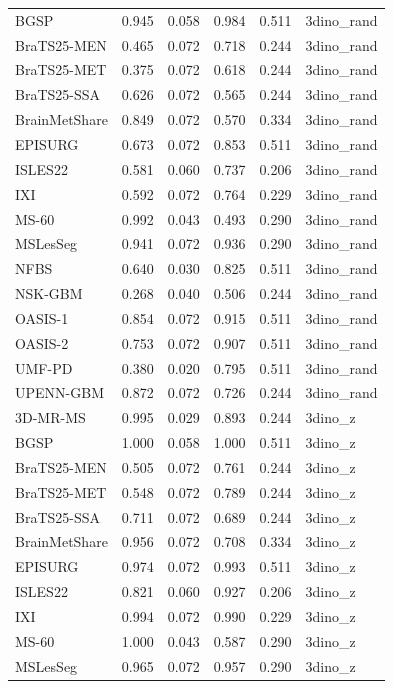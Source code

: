 \begin{tabular}{lrrrrl}
BGSP & 0.945 & 0.058 & 0.984 & 0.511 & 3dino\_rand \\
BraTS25-MEN & 0.465 & 0.072 & 0.718 & 0.244 & 3dino\_rand \\
BraTS25-MET & 0.375 & 0.072 & 0.618 & 0.244 & 3dino\_rand \\
BraTS25-SSA & 0.626 & 0.072 & 0.565 & 0.244 & 3dino\_rand \\
BrainMetShare & 0.849 & 0.072 & 0.570 & 0.334 & 3dino\_rand \\
EPISURG & 0.673 & 0.072 & 0.853 & 0.511 & 3dino\_rand \\
ISLES22 & 0.581 & 0.060 & 0.737 & 0.206 & 3dino\_rand \\
IXI & 0.592 & 0.072 & 0.764 & 0.229 & 3dino\_rand \\
MS-60 & 0.992 & 0.043 & 0.493 & 0.290 & 3dino\_rand \\
MSLesSeg & 0.941 & 0.072 & 0.936 & 0.290 & 3dino\_rand \\
NFBS & 0.640 & 0.030 & 0.825 & 0.511 & 3dino\_rand \\
NSK-GBM & 0.268 & 0.040 & 0.506 & 0.244 & 3dino\_rand \\
OASIS-1 & 0.854 & 0.072 & 0.915 & 0.511 & 3dino\_rand \\
OASIS-2 & 0.753 & 0.072 & 0.907 & 0.511 & 3dino\_rand \\
UMF-PD & 0.380 & 0.020 & 0.795 & 0.511 & 3dino\_rand \\
UPENN-GBM & 0.872 & 0.072 & 0.726 & 0.244 & 3dino\_rand \\
3D-MR-MS & 0.995 & 0.029 & 0.893 & 0.244 & 3dino\_z \\
BGSP & 1.000 & 0.058 & 1.000 & 0.511 & 3dino\_z \\
BraTS25-MEN & 0.505 & 0.072 & 0.761 & 0.244 & 3dino\_z \\
BraTS25-MET & 0.548 & 0.072 & 0.789 & 0.244 & 3dino\_z \\
BraTS25-SSA & 0.711 & 0.072 & 0.689 & 0.244 & 3dino\_z \\
BrainMetShare & 0.956 & 0.072 & 0.708 & 0.334 & 3dino\_z \\
EPISURG & 0.974 & 0.072 & 0.993 & 0.511 & 3dino\_z \\
ISLES22 & 0.821 & 0.060 & 0.927 & 0.206 & 3dino\_z \\
IXI & 0.994 & 0.072 & 0.990 & 0.229 & 3dino\_z \\
MS-60 & 1.000 & 0.043 & 0.587 & 0.290 & 3dino\_z \\
MSLesSeg & 0.965 & 0.072 & 0.957 & 0.290 & 3dino\_z \\

\end{tabular}
